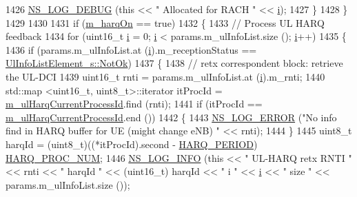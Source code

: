 \begin{DoxyCode}
1426           \hyperlink{group__logging_ga413f1886406d49f59a6a0a89b77b4d0a}{NS\_LOG\_DEBUG} (\textcolor{keyword}{this} << \textcolor{stringliteral}{" Allocated for RACH "} << \hyperlink{bernuolliDistribution_8m_a6f6ccfcf58b31cb6412107d9d5281426}{i});
1427         \}
1428     \}
1429 
1430 
1431   \textcolor{keywordflow}{if} (\hyperlink{classns3_1_1FdMtFfMacScheduler_abc95b8f62ff797ff3fb9ed21322c5f35}{m\_harqOn} == \textcolor{keyword}{true})
1432     \{
1433       \textcolor{comment}{//   Process UL HARQ feedback}
1434       \textcolor{keywordflow}{for} (uint16\_t \hyperlink{bernuolliDistribution_8m_a6f6ccfcf58b31cb6412107d9d5281426}{i} = 0; \hyperlink{bernuolliDistribution_8m_a6f6ccfcf58b31cb6412107d9d5281426}{i} < params.m\_ulInfoList.size (); \hyperlink{bernuolliDistribution_8m_a6f6ccfcf58b31cb6412107d9d5281426}{i}++)
1435         \{        
1436           \textcolor{keywordflow}{if} (params.m\_ulInfoList.at (\hyperlink{bernuolliDistribution_8m_a6f6ccfcf58b31cb6412107d9d5281426}{i}).m\_receptionStatus == 
      \hyperlink{structns3_1_1UlInfoListElement__s_a2a4dff5145d25c81086660e991db6f61a98aed738fd24811d3461668e394a53c8}{UlInfoListElement\_s::NotOk})
1437             \{
1438               \textcolor{comment}{// retx correspondent block: retrieve the UL-DCI}
1439               uint16\_t rnti = params.m\_ulInfoList.at (\hyperlink{bernuolliDistribution_8m_a6f6ccfcf58b31cb6412107d9d5281426}{i}).m\_rnti;
1440               std::map <uint16\_t, uint8\_t>::iterator itProcId = 
      \hyperlink{classns3_1_1FdMtFfMacScheduler_abdac9ae7be0c9b938eebf34dfb2f5126}{m\_ulHarqCurrentProcessId}.find (rnti);
1441               \textcolor{keywordflow}{if} (itProcId == \hyperlink{classns3_1_1FdMtFfMacScheduler_abdac9ae7be0c9b938eebf34dfb2f5126}{m\_ulHarqCurrentProcessId}.end ())
1442                 \{
1443                   \hyperlink{group__logging_ga0261a8db1d4ac5f79417d117634fd455}{NS\_LOG\_ERROR} (\textcolor{stringliteral}{"No info find in HARQ buffer for UE (might change eNB) "} << 
      rnti);
1444                 \}
1445               uint8\_t harqId = (uint8\_t)((*itProcId).second - \hyperlink{lte-common_8h_a275321ee206f130c3ddc81fcdaa13cfd}{HARQ\_PERIOD}) %
      \hyperlink{cqa-ff-mac-scheduler_8h_a9185d8d7d2b2979181d4a7044a3d3555}{HARQ\_PROC\_NUM};
1446               \hyperlink{group__logging_gafbd73ee2cf9f26b319f49086d8e860fb}{NS\_LOG\_INFO} (\textcolor{keyword}{this} << \textcolor{stringliteral}{" UL-HARQ retx RNTI "} << rnti << \textcolor{stringliteral}{" harqId "} << (uint16\_t)
      harqId << \textcolor{stringliteral}{" i "} << \hyperlink{bernuolliDistribution_8m_a6f6ccfcf58b31cb6412107d9d5281426}{i} << \textcolor{stringliteral}{" size "}  << params.m\_ulInfoList.size ());

\end{DoxyCode}

